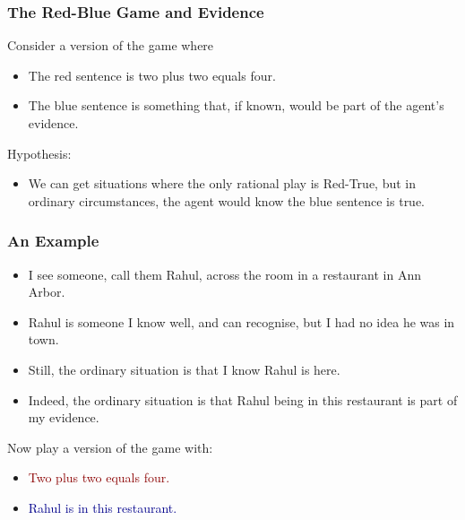 \begin{frame}

\frametitle{The Red-Blue Game and Evidence}
\label{thered-bluegameandevidence}

Consider a version of the game where

\begin{itemize}
\item The red sentence is two plus two equals four.

\item The blue sentence is something that, if known, would be part of the agent's evidence.

\end{itemize}

Hypothesis:

\begin{itemize}
\item We can get situations where the only rational play is Red-True, but in ordinary circumstances, the agent would know the blue sentence is true.

\end{itemize}

\end{frame}

\begin{frame}

\frametitle{An Example}
\label{anexample}

\begin{itemize}
\item I see someone, call them Rahul, across the room in a restaurant in Ann Arbor.

\item Rahul is someone I know well, and can recognise, but I had no idea he was in town.

\item Still, the ordinary situation is that I know Rahul is here.

\item Indeed, the ordinary situation is that Rahul being in this restaurant is part of my evidence.

\end{itemize}

Now play a version of the game with:

\begin{itemize}
\item \textcolor{darkred}{Two plus two equals four.}

\item \textcolor{darkblue}{Rahul is in this restaurant.}

\end{itemize}

\end{frame}

